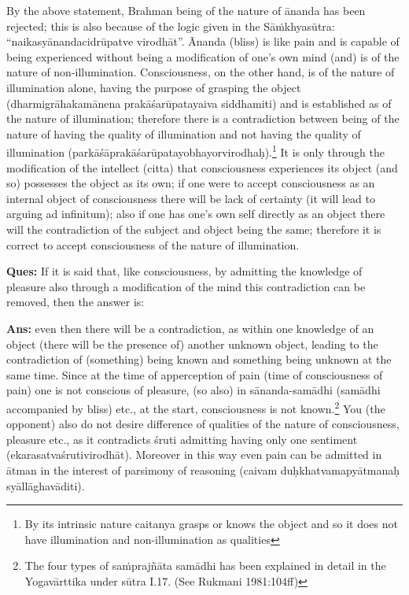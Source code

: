 By the above statement, Brahman being of the nature of ānanda has been rejected; this is also because of the logic given in the Sāṁkhyasūtra: “naikasyānandacidrūpatve virodhāt”. Ānanda (bliss) is like pain and is capable of being experienced without being a modification of one’s own  mind (and) is of the nature of non-illumination. Consciousness, on the other hand, is of the nature of illumination alone, having the purpose of grasping the object (dharmigrāhakamānena prakāśarūpatayaiva siddhamiti) and is established as of the nature of illumination; therefore there is a contradiction between being of the nature of having the quality of illumination and not having the quality of illumination (parkāśāprakāśarūpatayobhayorvirodhaḥ).\footnote{By its intrinsic nature caitanya grasps or knows the object and so it does not have illumination and non-illumination as qualities} It is only through the modification of the intellect (citta) that consciousness experiences its object (and so) possesses the object as its own; if one were to accept consciousness as an internal object of consciousness there will be lack of certainty (it will lead to arguing ad infinitum); also if one has one’s own self directly as an object there will the contradiction of the subject and object being the same; therefore it is correct to accept consciousness of the nature of illumination. 

\textbf{Ques:} If it is said that, like consciousness, by admitting the knowledge of pleasure also through a modification of the mind this contradiction can be removed, then the answer is: 

\textbf{Ans:} even then there will be a contradiction, as within one knowledge of an object (there will be the presence of) another unknown object, leading to the contradiction of (something) being known and something being unknown at the same time. Since at the time of apperception of pain (time of consciousness of pain) one is not conscious of pleasure, (so also)  in sānanda-samādhi (samādhi accompanied by bliss) etc., at the start, consciousness is not known.\footnote{The four types of saṁprajñāta samādhi has been explained in detail in the Yogavārttika under sūtra I.17. (See Rukmani 1981:104ff)} You (the opponent) also do not  desire difference of qualities of the nature of consciousness, pleasure etc., as it contradicts śruti admitting having only one sentiment (ekarasatvaśrutivirodhāt). Moreover in this way even pain can be admitted in ātman in the interest of parsimony of reasoning (caivam duḥkhatvamapyātmanaḥ syāllāghavāditi). 


